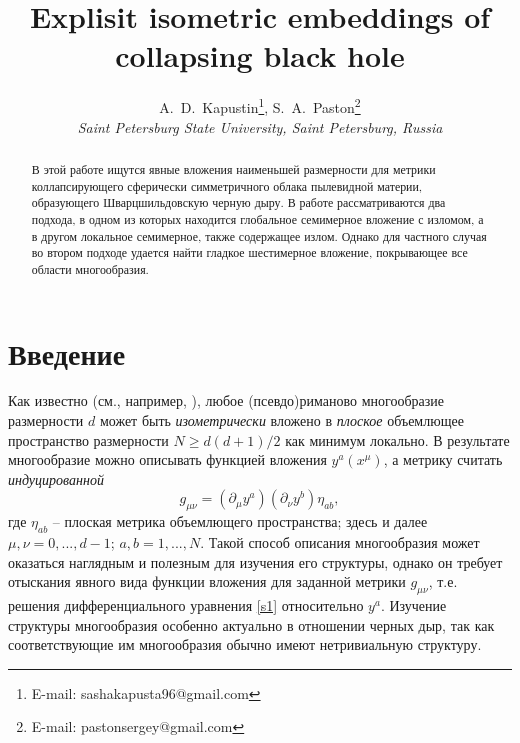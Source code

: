 \documentclass[12pt]{article}
\newcommand{\bq}{\begin{equation}}
\newcommand{\eq}{\end{equation}}
\begin{document}
\title{Explisit isometric embeddings of collapsing black hole}
\author{
A.~D.~Kapustin\thanks{E-mail: sashakapusta96@gmail.com},
S.~A.~Paston\thanks{E-mail: pastonsergey@gmail.com}\\
{\it Saint Petersburg State University, Saint Petersburg, Russia}
}
\date{\vskip 15mm}
\maketitle

\begin{abstract}
В этой работе ищутся явные вложения наименьшей размерности для метрики коллапсирующего сферически симметричного облака пылевидной материи, образующего Шварцшильдовскую черную дыру. В работе рассматриваются два подхода, в одном из которых находится глобальное семимерное вложение с изломом, а в другом локальное семимерное, также содержащее излом. Однако для частного случая во втором подходе удается найти гладкое шестимерное вложение, покрывающее все области многообразия.
\end{abstract}

\clearpage

\section{Введение}
Как известно (см., например, \cite{goenner}), любое (псевдо)риманово многообразие размерности $d$ может быть \emph{изометрически} вложено в \emph{плоское} объемлющее пространство размерности $N \geqslant d(d+1)/2$ как минимум локально.
В результате многообразие можно описывать функцией вложения $y^a(x^\mu)$, а метрику считать \emph{индуцированной}
\bq\label{s1}
	g_{\mu \nu} = (\partial_{\mu} y^a) (\partial_{\nu} y^b) \eta_{ab},
\eq
где $\eta_{ab}$ -- плоская метрика объемлющего пространства; здесь и далее $\mu,\nu=0,...,d-1$; $a,b=1,...,N$.
Такой способ описания многообразия может оказаться наглядным и полезным для изучения его структуры, однако он требует отыскания явного вида функции вложения для заданной метрики $g_{\mu\nu}$, т.е. решения дифференциального уравнения \eqref{s1} относительно $y^a$. Изучение структуры многообразия особенно актуально в отношении черных дыр, так как соответствующие им многообразия обычно имеют нетривиальную структуру.
\end{document}
